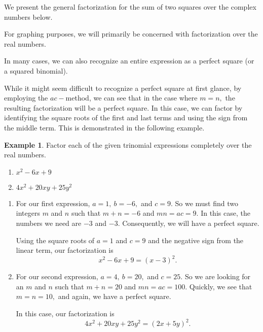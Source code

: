 \documentclass[12pt]{book}
\theoremstyle{definition}
\newtheorem{example}{Example}
\begin{document}
We present the general factorization for the sum of two squares over the complex numbers below.
\begin{center}
\end{center}
\newpage
For graphing purposes, we will primarily be concerned with factorization over the real numbers.
\par 
In many cases, we can also recognize an entire expression as a perfect square (or a squared binomial).
\begin{center}
\end{center}
While it might seem difficult to recognize a perfect square at first glance, by employing the $ac-$method, we can see that in the case where $m=n,$ the resulting factorization will be a perfect square. In this case, we can factor by identifying the square roots of the first and last
terms and using the sign from the middle term. This is demonstrated in the following example.
\begin{example} Factor each of the given trinomial expressions completely over the real numbers.
  \begin{multicols}{2}
	\begin{enumerate}
	\item $x^2-6x+9$
	\item $4x^2+20xy+25y^2$
	\end{enumerate}
	\end{multicols}
	\begin{enumerate}
	\item For our first expression, $a=1, \ b=-6,$ and $c=9$.  So we must find two integers $m$ and $n$ such that $m+n=-6$ and $mn=ac=9$.  In this case, the numbers we need are $-3$ and $-3$.  Consequently, we will have a perfect square.
	\par
	Using the square roots of $a=1$ and $c=9$ and the negative sign from the linear term, our factorization is 
	$$x^2-6x+9=\left(x-3\right)^2.$$
	\item For our second expression, $a=4, \ b=20,$ and $c=25$.  So we are looking for an $m$ and $n$ such that $m+n=20$ and $mn=ac=100$.  Quickly, we see that $m=n=10,$ and again, we have a perfect square.
	\par
	In this case, our factorization is
	$$4x^2+20xy+25y^2=\left(2x+5y\right)^2.$$
	\end{enumerate}
\end{example}
\end{document}
